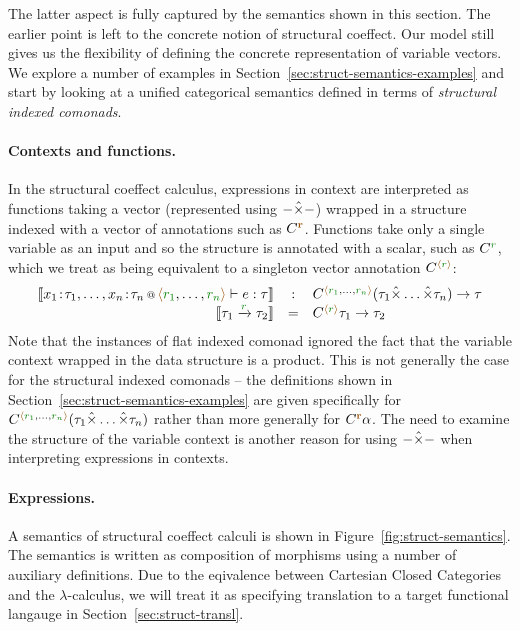The latter aspect is fully captured by the semantics shown in this section. The
earlier point is left to the concrete notion of structural coeffect. Our model still gives
us the flexibility of defining the concrete representation of variable vectors. We explore
a number of examples in Section~\ref{sec:struct-semantics-examples} and start by looking
at a unified categorical semantics defined in terms of \emph{structural indexed comonads}.

\paragraph{Contexts and functions.}
In the structural coeffect calculus, expressions in context are interpreted as functions taking
a vector (represented using $-\hat{\times}-$) wrapped in a structure indexed with a vector of annotations
such as $\ctyp{\aclrd{\textbf{r}}}$. Functions take only a single variable as an input and so the
structure is annotated with a scalar, such as $\ctyp{\cclrd{r}}$, which we treat as being equivalent
to a singleton vector annotation $\ctyp{\alift{\cclrd{r}}}$:
%
\begin{equation*}
\begin{array}{rcl}
\sem{\coctx{x_1\!:\!\tau_1, \ldots, x_n\!:\!\tau_n}{ \alift{\cclrd{r_1}, \ldots, \cclrd{r_n}} } \vdash e : \tau}
  &:& \ctyp{ \alift{\cclrd{r_1}, \ldots, \cclrd{r_n}} }{(\tau_1 \xtimes \ldots \xtimes \tau_n)} \rightarrow \tau\\
\sem{\tau_1 \xrightarrow{\cclrd{r}} \tau_2} &=& \ctyp{\alift{\cclrd{r}}}{\tau_1} \rightarrow \tau_2
\end{array}
\end{equation*}
%
Note that the instances of flat indexed comonad ignored the fact that the variable
context wrapped in the data structure is a product. This is not generally the case for the
structural indexed comonads -- the definitions shown in Section~\ref{sec:struct-semantics-examples}
are given specifically for $\ctyp{ \alift{\cclrd{r_1}, \ldots, \cclrd{r_n}} }{(\tau_1 \xtimes \ldots \xtimes \tau_n)}$
rather than more generally for $\ctyp{\aclrd{\textbf{r}}}{\alpha}$. The need to examine the structure
of the variable context is another reason for using $-\hat{\times}-$ when interpreting expressions in contexts.

\paragraph{Expressions.}
A semantics of structural coeffect calculi is shown in Figure~\ref{fig:struct-semantics}. The
semantics is written as composition of morphisms using a number of auxiliary definitions. Due to
the eqivalence between Cartesian Closed Categories and the $\lambda$-calculus, we will treat it
as specifying translation to a target functional langauge in Section~\ref{sec:struct-transl}.

